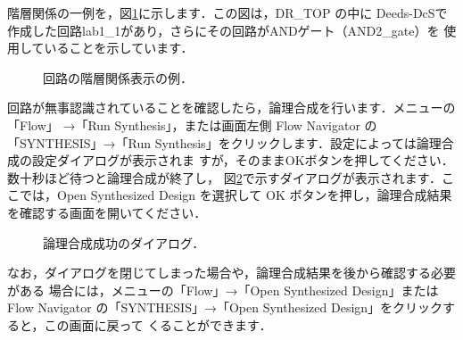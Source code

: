 階層関係の一例を，図\ref{fig:Vivado1_7_mod}に示します．この図は，DR\_TOP の中に
Deeds-DcSで作成した回路lab1\_1があり，さらにその回路がANDゲート（AND2\_gate）を
使用していることを示しています．

\begin{figure}[ht]
 \centering
 \caption{回路の階層関係表示の例．}
 \label{fig:Vivado1_7_mod}
\end{figure}

回路が無事認識されていることを確認したら，論理合成を行います．メニューの「Flow」
→「Run Synthesis」，または画面左側 Flow Navigator の「SYNTHESIS」→「Run
Synthesis」をクリックします．設定によっては論理合成の設定ダイアログが表示されま
すが，そのままOKボタンを押してください．数十秒ほど待つと論理合成が終了し，
図\ref{fig:Vivado1_8}で示すダイアログが表示されます．ここでは，Open Synthesized
Design を選択して OK ボタンを押し，論理合成結果を確認する画面を開いてください．

\begin{figure}[ht]
 \centering
 \caption{論理合成成功のダイアログ．}
 \label{fig:Vivado1_8}
\end{figure}

なお，ダイアログを閉じてしまった場合や，論理合成結果を後から確認する必要がある
場合には，メニューの「Flow」→「Open Synthesized Design」または Flow Navigator
の「SYNTHESIS」→「Open Synthesized Design」をクリックすると，この画面に戻って
くることができます．

